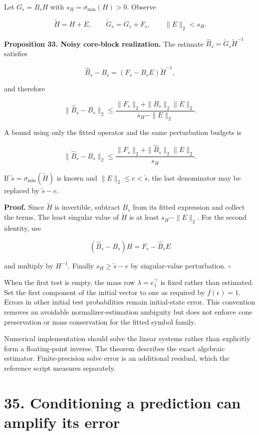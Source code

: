 \documentclass[11pt,letterpaper]{article}
\begin{document}
Let \(G_s=B_sH\) with \(s_H=\sigma_{\min}(H)>0\). Observe

\[
\widetilde H=H+E,\qquad
\widetilde G_s=G_s+F_s,\qquad
\|E\|_2<s_H.
\]

\textbf{Proposition 33. Noisy core-block realization.} The estimate
\(\widehat B_s=\widetilde G_s\widetilde H^{-1}\) satisfies

\[
\widehat B_s-B_s=(F_s-B_sE)\widetilde H^{-1},
\]

and therefore

\[
\boxed{
\|\widehat B_s-B_s\|_2
\leq\frac{\|F_s\|_2+\|B_s\|_2\|E\|_2}{s_H-\|E\|_2}.
}
\]

A bound using only the fitted operator and the same perturbation budgets
is

\[
\|\widehat B_s-B_s\|_2
\leq
\frac{\|F_s\|_2+\|\widehat B_s\|_2\|E\|_2}{s_H}.
\]

If \(\widetilde s=\sigma_{\min}(\widetilde H)\) is known and
\(\|E\|_2\leq e<\widetilde s\), the last denominator may be replaced by
\(\widetilde s-e\).

\textbf{Proof.} Since \(\widetilde H\) is invertible, subtract \(B_s\)
from its fitted expression and collect the terms. The least singular
value of \(\widetilde H\) is at least \(s_H-\|E\|_2\). For the second
identity, use

\[
(\widehat B_s-B_s)H=F_s-\widehat B_sE
\]

and multiply by \(H^{-1}\). Finally \(s_H\geq\widetilde s-e\) by
singular-value perturbation. \(\square\)

When the first test is empty, the mass row \(\lambda=e_1^\top\) is fixed
rather than estimated. Set the first component of the initial vector to
one as required by \(f(\epsilon)=1\). Errors in other initial test
probabilities remain initial-state error. This convention removes an
avoidable normalizer-estimation ambiguity but does not enforce cone
preservation or mass conservation for the fitted symbol family.

Numerical implementation should solve the linear systems rather than
explicitly form a floating-point inverse. The theorem describes the
exact algebraic estimator. Finite-precision solve error is an additional
residual, which the reference script measures separately.

\section{35. Conditioning a prediction can amplify its
error}\label{conditioning-a-prediction-can-amplify-its-error}
\end{document}
